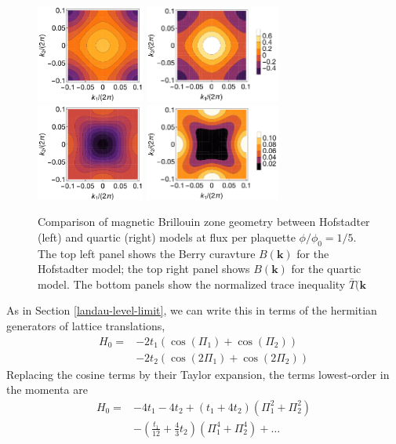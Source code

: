 \documentclass[aps,prb,twocolumn,letterpaper,twoside,nobalancelastpage,groupedaddress,amsmath,amssymb,floatfix,citeautoscript]{revtex4-1}
\begin{document}
\begin{figure}[thb]
\centering
\includegraphics[width=1.4in]{curv-hof-n5.pdf}
\includegraphics[width=1.75in]{curv-qrt-n5.pdf}
\includegraphics[width=1.4in]{norm-tr-hof-n5.pdf}
\includegraphics[width=1.75in]{norm-tr-qrt-n5.pdf}
\caption{Comparison of magnetic Brillouin zone geometry between Hofstadter (left) and quartic (right) models at flux per plaquette $\phi/\phi_0=1/5$. The top left panel shows the Berry curavture $B(\mathbf{k})$ for the Hofstadter model; the top right panel shows $B(\mathbf{k})$ for the quartic model. The bottom panels show the normalized trace inequality $\bar{T}(\mathbf{k}$}
\end{figure}

As in Section \ref{landau-level-limit}, we can write this in terms of the hermitian generators of lattice translations,
\begin{align*}
H_0 = &-2t_1\left(\cos(\Pi_1) + \cos(\Pi_2)\right)\\ &- 2t_2\left(\cos(2\Pi_1) + \cos(2\Pi_2)\right)
\end{align*}
Replacing the cosine terms by their Taylor expansion, the terms lowest-order in the momenta are 
\begin{align*}{}
H_0 = &-4 t_1 - 4 t_2 + (t_1 + 4t_2) \left(\Pi_1^2 + \Pi_2^2\right) \\
&- \left(\frac{t_1}{12} + \frac{4}{3}t_2\right) \left(\Pi_1^4 + \Pi_2^4\right) + \ldots
\end{align*}
\end{document}
